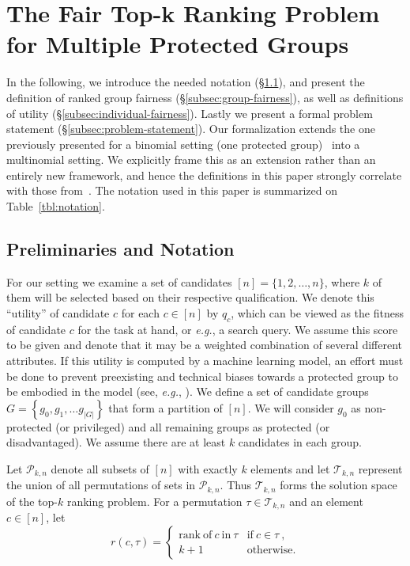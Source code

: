 
\section{The Fair Top-k Ranking Problem for Multiple Protected Groups}\label{sec:problem}

In the following, we introduce the needed notation (\S\ref{subsec:preliminaries}), and present the definition of ranked group fairness (\S\ref{subsec:group-fairness}), as well as definitions of utility (\S\ref{subsec:individual-fairness}). Lastly we present a formal problem statement (\S\ref{subsec:problem-statement}).
%
Our formalization extends the one previously presented for a binomial setting (one protected group)~\cite{zehlike2017fair} into a multinomial setting.
%
We explicitly frame this as an extension rather than an entirely new framework, and hence the definitions in this paper strongly correlate with those from~\cite{zehlike2017fair}.
%
The notation used in this paper is summarized on Table~\ref{tbl:notation}.

\subsection{Preliminaries and Notation}
\label{subsec:preliminaries}
For our setting we examine a set of candidates $[n] = \{ 1, 2, \dots, n \}$, where $k$ of them will be selected based on their respective qualification. We denote this ``utility'' of candidate $c$ for each $c \in [n]$ by $q_c$, which can be viewed as the fitness of candidate $c$ for the task at hand, or {\it e.g.}, a search query. We assume this score to be given and denote that it may be a weighted combination of several different attributes.
%
If this utility is computed by a machine learning model, an effort must be done to prevent preexisting and technical biases towards a protected group to be embodied in the model (see, {\it e.g.}, \cite{Sweeney2013}).
%
We define a set of candidate groups $G = \left\{g_0, g_1, \ldots g_{|G|}\right\}$ that form a partition of $[n]$. We will consider $g_0$ as non-protected (or privileged) and all remaining groups as protected (or disadvantaged).
%
We assume there are at least $k$ candidates in each group. %

Let ${\mathcal P}_{k,n}$ denote all subsets of $[n]$ with exactly $k$ elements and let ${\mathcal T}_{k,n}$ represent the union of all permutations of sets in ${\mathcal P}_{k,n}$.
%
Thus ${\mathcal T}_{k,n}$ forms the solution space of the top-$k$ ranking problem.
%
For a permutation $\tau \in {\mathcal T}_{k,n}$ and an element $c \in [n]$, let
\[
r(c, \tau) = \begin{cases}
\mathrm{rank~of~} c \mathrm{~in~} \tau & \mathrm{if~} c \in \tau~, \\
k + 1 & \mathrm{otherwise}.
\end{cases}
\]

